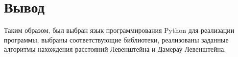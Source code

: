 \section{Вывод}
Таким образом, был выбран язык программирования Python для реализации программы, выбраны соответствующие библиотеки, реализованы заданные алгоритмы нахождения расстояний Левенштейна и Дамерау-Левенштейна. 